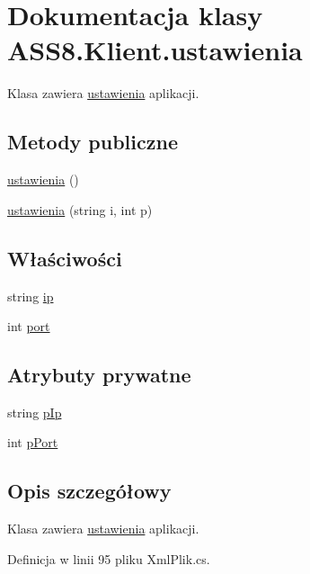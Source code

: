 \hypertarget{a00028}{
\section{Dokumentacja klasy ASS8.Klient.ustawienia}
\label{dc/d3c/a00028}
}
Klasa zawiera \hyperlink{a00028}{ustawienia} aplikacji.  


\subsection*{Metody publiczne}
\begin{CompactItemize}
\item 
\hyperlink{a00028_f1bd27e0477ee60679903f8da05880f6}{ustawienia} ()
\item 
\hyperlink{a00028_a106e294dcbaf3f6ee35391245e2cfbe}{ustawienia} (string i, int p)
\end{CompactItemize}
\subsection*{Właściwości}
\begin{CompactItemize}
\item 
string \hyperlink{a00028_9aaac556989a57c37e8becb3a6067a5b}{ip}
\item 
int \hyperlink{a00028_f060f33463bbb7ece76cf9bbc4eec698}{port}
\end{CompactItemize}
\subsection*{Atrybuty prywatne}
\begin{CompactItemize}
\item 
string \hyperlink{a00028_7e640b9285f7ac1b34b50b95193e3db6}{pIp}
\item 
int \hyperlink{a00028_77ec7b173849fa53b9230b15d7d1b9f8}{pPort}
\end{CompactItemize}


\subsection{Opis szczegółowy}
Klasa zawiera \hyperlink{a00028}{ustawienia} aplikacji. 



Definicja w linii 95 pliku XmlPlik.cs.

